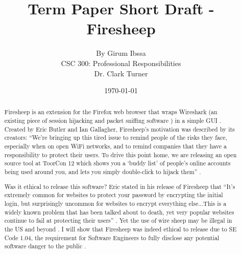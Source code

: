 \documentclass[12pt,twocolumn]{article}
\begin{document}
\onecolumn
\title{\vfill Term Paper Short Draft - Firesheep} %
\author{
By Girum Ibssa \vspace{10pt} \\
CSC 300: Professional Responsibilities  \vspace{10pt} \\
Dr. Clark Turner \vspace{10pt} \\
}
\date{\today} %

\maketitle

\vfill  %
\begin{abstract}
Firesheep is an extension for the Firefox web browser that wraps Wireshark (an existing piece of session hijacking and packet sniffing software \cite{wireshark}) in a simple GUI \cite{firesheep-source}. Created by Eric Butler and Ian Gallagher, Firesheep's motivation was described by its creators: ``We're bringing up this tired issue to remind people of the risks they face, especially when on open WiFi networks, and to remind companies that they have a responsibility to protect their users. To drive this point home, we are releasing an open source tool at ToorCon 12 which shows you a `buddy list' of people's online accounts being used around you, and lets you simply double-click to hijack them'' \cite{security-now}.

Was it ethical to release this software? Eric stated in his release of Firesheep that ``It's extremely common for websites to protect your password by encrypting the initial login, but surprisingly uncommon for websites to encrypt everything else...This is a widely known problem that has been talked about to death, yet very popular websites continue to fail at protecting their users'' \cite{eric-butler}. Yet the use of wire sheep may be illegal in the US and beyond \cite{illegal-to-use-firesheep}. I will show that Firesheep was indeed ethical to release due to SE Code 1.04, the requirement for Software Engineers to fully disclose any potential software danger to the public \cite{se-code}.

\end{abstract}
\thispagestyle{empty} %
\newpage
\twocolumn
\end{document}
